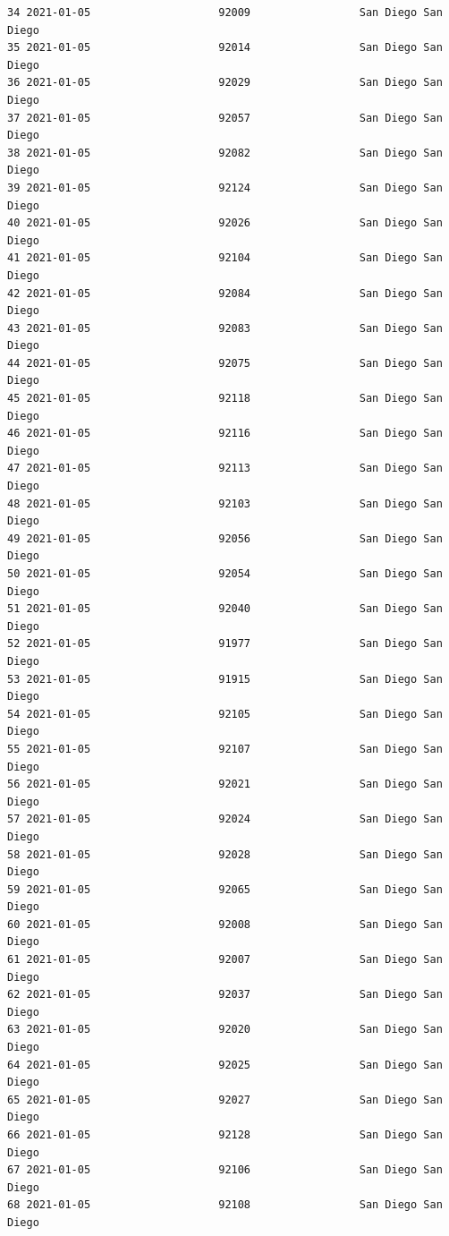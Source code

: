 \documentclass[
  letterpaper,
  DIV=11,
  numbers=noendperiod]{scrartcl}
\begin{document}
\begin{verbatim}
34 2021-01-05                    92009                 San Diego San Diego
35 2021-01-05                    92014                 San Diego San Diego
36 2021-01-05                    92029                 San Diego San Diego
37 2021-01-05                    92057                 San Diego San Diego
38 2021-01-05                    92082                 San Diego San Diego
39 2021-01-05                    92124                 San Diego San Diego
40 2021-01-05                    92026                 San Diego San Diego
41 2021-01-05                    92104                 San Diego San Diego
42 2021-01-05                    92084                 San Diego San Diego
43 2021-01-05                    92083                 San Diego San Diego
44 2021-01-05                    92075                 San Diego San Diego
45 2021-01-05                    92118                 San Diego San Diego
46 2021-01-05                    92116                 San Diego San Diego
47 2021-01-05                    92113                 San Diego San Diego
48 2021-01-05                    92103                 San Diego San Diego
49 2021-01-05                    92056                 San Diego San Diego
50 2021-01-05                    92054                 San Diego San Diego
51 2021-01-05                    92040                 San Diego San Diego
52 2021-01-05                    91977                 San Diego San Diego
53 2021-01-05                    91915                 San Diego San Diego
54 2021-01-05                    92105                 San Diego San Diego
55 2021-01-05                    92107                 San Diego San Diego
56 2021-01-05                    92021                 San Diego San Diego
57 2021-01-05                    92024                 San Diego San Diego
58 2021-01-05                    92028                 San Diego San Diego
59 2021-01-05                    92065                 San Diego San Diego
60 2021-01-05                    92008                 San Diego San Diego
61 2021-01-05                    92007                 San Diego San Diego
62 2021-01-05                    92037                 San Diego San Diego
63 2021-01-05                    92020                 San Diego San Diego
64 2021-01-05                    92025                 San Diego San Diego
65 2021-01-05                    92027                 San Diego San Diego
66 2021-01-05                    92128                 San Diego San Diego
67 2021-01-05                    92106                 San Diego San Diego
68 2021-01-05                    92108                 San Diego San Diego

\end{verbatim}
\end{document}
